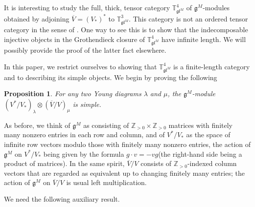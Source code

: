 \documentclass[11pt]{article}
\theoremstyle{plain}
\newtheorem{proposition}[lemma]{Proposition}
\theoremstyle{nonumberplain}
\theoremstyle{plain}
\theoremstyle{nonumberplain}
\newcommand\bT{{\mathbb T}}
\newcommand\bZ{{\mathbb Z}}
\newcommand\fg{\mathfrak{g}}
\newcommand\fgl{\mathfrak{gl}}
\newcommand\ol{\overline}
\begin{document}
It is interesting to study the full, thick, tensor category $\bT^4_{\fgl^M}$ of $\fg^M$-modules obtained by adjoining $\ol{V}=(V_*)^*$ to $\bT^3_{\fgl^M}$. This category is not an ordered tensor category in the sense of . One way to see this is to show that the indecomposable injective objects in the Grothendieck closure of $\bT^4_{\fgl^M}$ have infinite length.  We will possibly provide the proof of the latter fact elsewhere.


In this paper, we restrict ourselves to showing that $\bT^4_{\fgl^M}$ is a finite-length category and to describing its simple objects. We begin by proving the following


\begin{proposition}\label{pr.simples}
  For any two Young diagrams $\lambda$ and $\mu$, the $\fg^M$-module $(V^*/V_*)_\lambda\otimes\left(\ol{V}/V\right)_\mu$ is simple.  
\end{proposition}






As before, we think of $\fg^M$ as consisting of $\bZ_{>0}\times \bZ_{>0}$ matrices with finitely many nonzero entries in each row and column, and of $V^*/V_*$ as the space of infinite row vectors modulo those with finitely many nonzero entries, the action of $\fg^M$ on $V^*/V_*$ being given by the formula $g\cdot v=-vg$(the right-hand side being a product of matrices). In the same spirit, $\ol{V}/V$ consists of $\bZ_{>0}$-indexed column vectors that are regarded as equivalent up to changing finitely many entries; the action of $\fg^M$ on $\ol{V}/V$ is usual left multiplication.

We need the following auxiliary result. 
\end{document}
